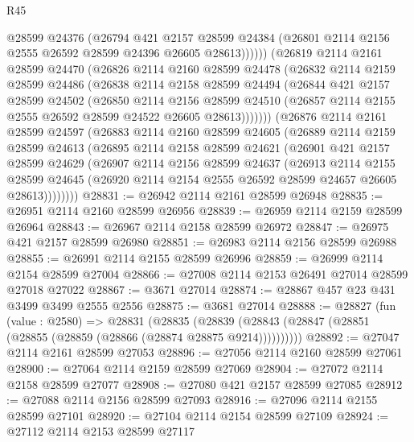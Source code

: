 \begin{lexlean}{R45}
\begin{coremodule}
            @28599
            @24376
            (@26794
              @421
              @2157
              @28599
              @24384
              (@26801 @2114 @2156 @2555 @26592 @28599 @24396 @26605 @28613))))))
    (@26819
      @2114
      @2161
      @28599
      @24470
      (@26826
        @2114
        @2160
        @28599
        @24478
        (@26832
          @2114
          @2159
          @28599
          @24486
          (@26838
            @2114
            @2158
            @28599
            @24494
            (@26844
              @421
              @2157
              @28599
              @24502
              (@26850
                @2114
                @2156
                @28599
                @24510
                (@26857 @2114 @2155 @2555 @26592 @28599 @24522 @26605 @28613)))))))
    (@26876
      @2114
      @2161
      @28599
      @24597
      (@26883
        @2114
        @2160
        @28599
        @24605
        (@26889
          @2114
          @2159
          @28599
          @24613
          (@26895
            @2114
            @2158
            @28599
            @24621
            (@26901
              @421
              @2157
              @28599
              @24629
              (@26907
                @2114
                @2156
                @28599
                @24637
                (@26913
                  @2114
                  @2155
                  @28599
                  @24645
                  (@26920 @2114 @2154 @2555 @26592 @28599 @24657 @26605 @28613))))))))
@28831 := @26942 @2114 @2161 @28599 @26948
@28835 := @26951 @2114 @2160 @28599 @26956
@28839 := @26959 @2114 @2159 @28599 @26964
@28843 := @26967 @2114 @2158 @28599 @26972
@28847 := @26975 @421 @2157 @28599 @26980
@28851 := @26983 @2114 @2156 @28599 @26988
@28855 := @26991 @2114 @2155 @28599 @26996
@28859 := @26999 @2114 @2154 @28599 @27004
@28866 := @27008 @2114 @2153 @26491 @27014 @28599 @27018 @27022
@28867 := @3671 @27014
@28874 := @28867 @457 @23 @431 @3499 @3499 @2555 @2556
@28875 := @3681 @27014
@28888 := @28827
    (fun (value : @2580) =>
    @28831
      (@28835 (@28839 (@28843 (@28847 (@28851 (@28855 (@28859 (@28866 (@28874 @28875 @9214))))))))))
@28892 := @27047 @2114 @2161 @28599 @27053
@28896 := @27056 @2114 @2160 @28599 @27061
@28900 := @27064 @2114 @2159 @28599 @27069
@28904 := @27072 @2114 @2158 @28599 @27077
@28908 := @27080 @421 @2157 @28599 @27085
@28912 := @27088 @2114 @2156 @28599 @27093
@28916 := @27096 @2114 @2155 @28599 @27101
@28920 := @27104 @2114 @2154 @28599 @27109
@28924 := @27112 @2114 @2153 @28599 @27117

\end{coremodule}
\end{lexlean}
